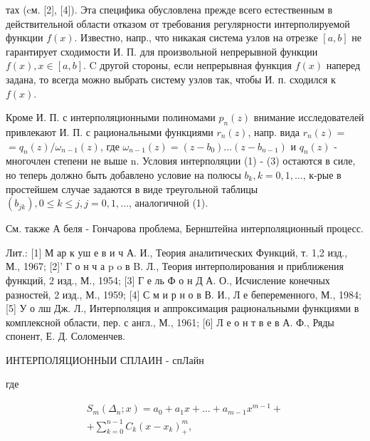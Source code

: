 \documentclass[10pt]{article}
\begin{document}
тах (cм. [2], [4]). Эта специфика обусловлена прежде всего естественным в действительной области отказом от требования регулярности интерполируемой функции $f(x)$. Известно, напр., что никакая система узлов на отрезке $[a, b]$ не гарантирует сходимости И. П. для произвольной непрерывной функции $f(x), x \in[a, b]$. C другой стороны, если непрерывная функция $f(x)$ наперед задана, то всегда можно выбрать систему узлов так, чтобы И. п. сходился к $f(x)$.



Кроме И. П. с интерполяционными полиномами $p_{n}(z)$ внимание исследователей привлекают И. П. с рациональными функциями $r_{n}(z)$, напр. вида $r_{n}(z)=$ $=q_{n}(z) / \omega_{n-1}(z)$, где $\omega_{n-1}(z)=\left(z-b_{0}\right) \ldots\left(z-b_{n-1}\right)$ и $q_{n}(z)$ - многочлен степени не выше n. Условия интерполяции (1) - (3) остаются в силе, но теперь должно быть добавлено условие на полюсы $b_{k}, k=0,1, \ldots$, к-рые в простейшем случае задаются в виде треугольной таблицы $\left(b_{j k}\right), 0 \leqslant k \leqslant j, j=0,1, \ldots$, аналогичной (1).



См. также А беля - Гончарова проблема, Бернштейна интерполяционный процесс.



Лит.: [1] М ар к уш е в и ч А. И., Теория аналитических Функций, т. 1,2 изд., М., 1967; [2]' Г о н ч а p o в B. Л., Теория интерполирования и приближения функций, 2 изд., М., 1954; [3] Г е ль Ф о н Д А. О., Исчисление конечных разностей, 2 изд., М., 1959; [4] С м и р н о в В. И., Л е бепеременного, М., 1984; [5] У о лш Дж. Л., Интерполяция и аппроксимация рациональными функциями в комплексной области, пер. с англ., М., 1961; [6] Л е о н т в е в А. Ф., Ряды спонент, Е. Д. Соломенчев.



ИНТЕРПОЛЯЦИОННЫИ СПЛАИН - спЛайн



где



\[

\begin{gathered}

S_{m}\left(\Delta_{n} ; x\right)=a_{0}+a_{1} x+\ldots+a_{m-1} x^{m-1}+ \\

+\sum_{k=0}^{n-1} C_{k}\left(x-x_{k}\right)_{+}^{m},

\end{gathered}

\]
\end{document}
